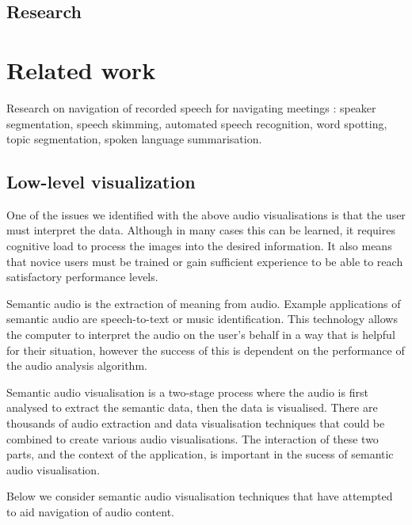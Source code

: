 \subsection{Research}


\section{Related work}

Research on navigation of recorded speech for navigating meetings \citep{Bouamrane2007}: speaker segmentation, speech
skimming, automated speech recognition, word spotting, topic segmentation, spoken language summarisation.


\subsection{Low-level visualization}

One of the issues we identified with the above audio visualisations is that the user must interpret the data. Although
in many cases this can be learned, it requires cognitive load to process the images into the desired information. It
also means that novice users must be trained or gain sufficient experience to be able to reach satisfactory performance
levels.

Semantic audio is the extraction of meaning from audio. Example applications of semantic audio are speech-to-text or
music identification. This technology allows the computer to interpret the audio on the user's behalf in a way that is
helpful for their situation, however the success of this is dependent on the performance of the audio analysis
algorithm.

Semantic audio visualisation is a two-stage process where the audio is first analysed to extract the semantic data,
then the data is visualised. There are thousands of audio extraction and data visualisation techniques that could
be combined to create various audio visualisations. The interaction of these two parts, and the context of the
application, is important in the sucess of semantic audio visualisation. 

Below we consider semantic audio visualisation techniques that have attempted to aid navigation of audio content.


